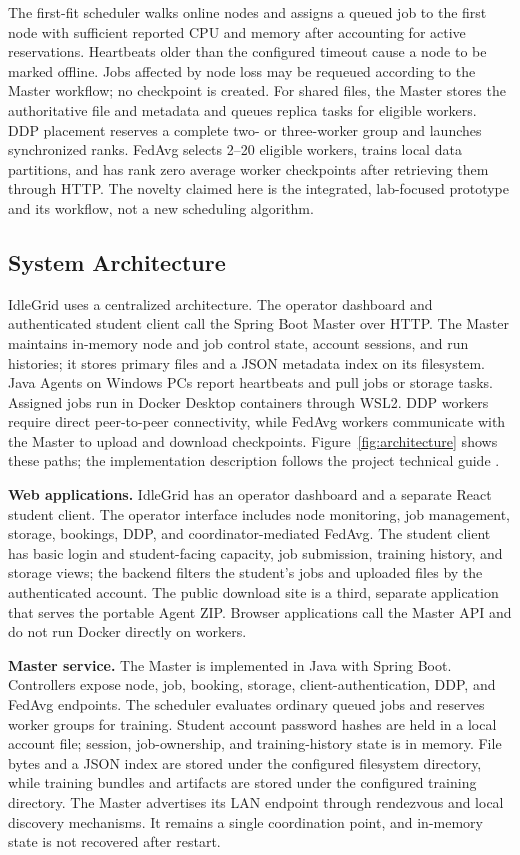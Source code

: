\documentclass{article}
\begin{document}
The first-fit scheduler walks online nodes and assigns a queued job to the first node with sufficient reported CPU and memory after accounting for active reservations. Heartbeats older than the configured timeout cause a node to be marked offline. Jobs affected by node loss may be requeued according to the Master workflow; no checkpoint is created. For shared files, the Master stores the authoritative file and metadata and queues replica tasks for eligible workers. DDP placement reserves a complete two- or three-worker group and launches synchronized ranks. FedAvg selects 2--20 eligible workers, trains local data partitions, and has rank zero average worker checkpoints after retrieving them through HTTP. The novelty claimed here is the integrated, lab-focused prototype and its workflow, not a new scheduling algorithm.
    
	\subsection{System Architecture}
IdleGrid uses a centralized architecture. The operator dashboard and authenticated student client call the Spring Boot Master over HTTP. The Master maintains in-memory node and job control state, account sessions, and run histories; it stores primary files and a JSON metadata index on its filesystem. Java Agents on Windows PCs report heartbeats and pull jobs or storage tasks. Assigned jobs run in Docker Desktop containers through WSL2. DDP workers require direct peer-to-peer connectivity, while FedAvg workers communicate with the Master to upload and download checkpoints. Figure~\ref{fig:architecture} shows these paths; the implementation description follows the project technical guide \cite{idlegridguide}.

\textbf{Web applications.} IdleGrid has an operator dashboard and a separate React student client. The operator interface includes node monitoring, job management, storage, bookings, DDP, and coordinator-mediated FedAvg. The student client has basic login and student-facing capacity, job submission, training history, and storage views; the backend filters the student's jobs and uploaded files by the authenticated account. The public download site is a third, separate application that serves the portable Agent ZIP. Browser applications call the Master API and do not run Docker directly on workers.

\textbf{Master service.} The Master is implemented in Java with Spring Boot. Controllers expose node, job, booking, storage, client-authentication, DDP, and FedAvg endpoints. The scheduler evaluates ordinary queued jobs and reserves worker groups for training. Student account password hashes are held in a local account file; session, job-ownership, and training-history state is in memory. File bytes and a JSON index are stored under the configured filesystem directory, while training bundles and artifacts are stored under the configured training directory. The Master advertises its LAN endpoint through rendezvous and local discovery mechanisms. It remains a single coordination point, and in-memory state is not recovered after restart.
\end{document}
